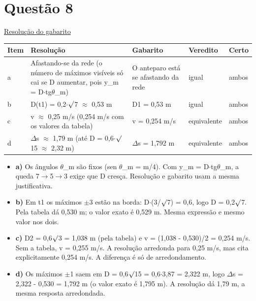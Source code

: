 \documentclass{article}%
\begin{document}
\section*{Questão 8}%
\href{https://poliedroresolve.sistemapoliedro.com.br/vestibulares/ime/2027/ime-2-fase-dia-2-27-10-2026-2-fase-dia-2/dissertativa-8-fisica-2-fase-dia-2-ime-2027}{Resolução do gabarito}\par\smallskip%
\begin{longtable}{@{}p{} p{} p{} p{} p{}@{}}\toprule Item & Resolução & Gabarito & Veredito & Certo \\ \midrule
a & Afastando{-}se da rede (o número de máximos visíveis só cai se D aumentar, pois y\_m = D$\cdot$tg$\theta$\_m) & O anteparo está se afastando da rede & igual & ambos \\
b & D(t1) = 0,2$\cdot$$\surd$7 $\approx$ 0,53 m & D1 = 0,53 m & igual & ambos \\
c & v $\approx$ 0,25 m/s (0,254 m/s com os valores da tabela) & v = 0,254 m/s & equivalente & ambos \\
d & $\Delta$s $\approx$ 1,79 m (até D = 0,6$\cdot$$\surd$15 $\approx$ 2,32 m) & $\Delta$s = 1,792 m & equivalente & ambos \\
\bottomrule\end{longtable}%
\begin{itemize}%
\item%
\textbf{a)} Os ângulos $\theta$\_m são fixos (sen $\theta$\_m = m/4). Com y\_m = D$\cdot$tg$\theta$\_m, a queda 7$\to$5$\to$3 exige que D cresça. Resolução e gabarito usam a mesma justificativa.%
\item%
\textbf{b)} Em t1 os máximos $\pm$3 estão na borda: D$\cdot$(3/$\surd$7) = 0,6, logo D = 0,2$\surd$7. Pela tabela dá 0,530 m; o valor exato é 0,529 m. Mesma expressão e mesmo valor nos dois.%
\item%
\textbf{c)} D2 = 0,6$\surd$3 = 1,038 m (pela tabela) e v = (1,038 - 0,530)/2 = 0,254 m/s. Sem a tabela, v = 0,255 m/s. A resolução arredonda para 0,25 m/s, mas cita explicitamente 0,254 m/s. A diferença é só de arredondamento.%
\item%
\textbf{d)} Os máximos $\pm$1 saem em D = 0,6$\surd$15 = 0,6$\cdot$3,87 = 2,322 m, logo $\Delta$s = 2,322 - 0,530 = 1,792 m (o valor exato é 1,795 m). A resolução dá 1,79 m, a mesma resposta arredondada.%
\end{itemize}%
\end{document}
